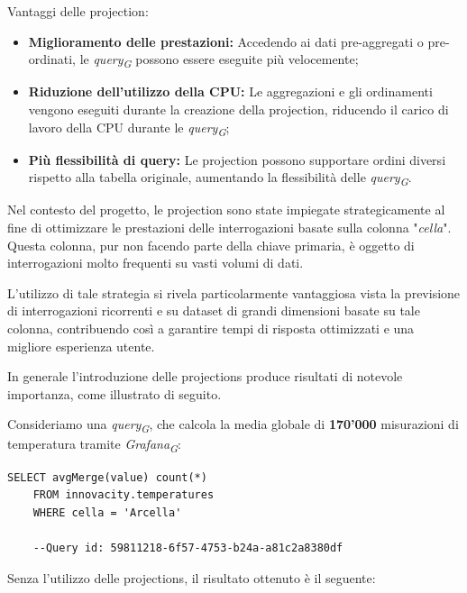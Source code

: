 Vantaggi delle projection:
\begin{itemize}
	\item \textbf{Miglioramento delle prestazioni:} Accedendo ai dati pre-aggregati o pre-ordinati, le \textit{query}\textsubscript{\textit{G}} possono essere eseguite più velocemente;
	\item \textbf{Riduzione dell'utilizzo della CPU:} Le aggregazioni e gli ordinamenti vengono eseguiti durante la creazione della projection, riducendo il carico di lavoro della CPU durante le \textit{query}\textsubscript{\textit{G}};
	\item \textbf{Più flessibilità di query:} Le projection possono supportare ordini diversi rispetto alla tabella originale, aumentando la flessibilità delle \textit{query}\textsubscript{\textit{G}}.
\end{itemize}

Nel contesto del progetto, le projection sono state impiegate strategicamente al fine di ottimizzare le prestazioni delle interrogazioni basate sulla colonna "\textit{cella}". Questa colonna, pur non facendo parte della chiave primaria, è oggetto di interrogazioni molto frequenti su vasti volumi di dati.

L'utilizzo di tale strategia si rivela particolarmente vantaggiosa vista la previsione di interrogazioni ricorrenti e su dataset di grandi dimensioni basate su tale colonna, contribuendo così a garantire tempi di risposta ottimizzati e una migliore esperienza utente.

In generale l'introduzione delle projections produce risultati di notevole importanza, come illustrato di seguito.

Consideriamo una \textit{query}\textsubscript{\textit{G}}, che calcola la media globale di \textbf{170'000} misurazioni di temperatura tramite \textit{Grafana}\textsubscript{\textit{G}}:

\begin{lstlisting}[caption={Esempio query - Grafana}, captionpos=b]
	SELECT avgMerge(value) count(*)
	FROM innovacity.temperatures
	WHERE cella = 'Arcella'

	--Query id: 59811218-6f57-4753-b24a-a81c2a8380df
\end{lstlisting}

Senza l'utilizzo delle projections, il risultato ottenuto è il seguente:


